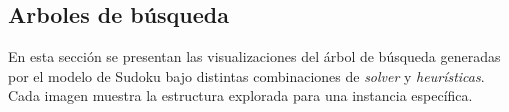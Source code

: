 
\subsection{Arboles de búsqueda}\label{sec:arboles}
En esta sección se presentan las visualizaciones del árbol de búsqueda generadas por el modelo de Sudoku bajo distintas combinaciones de \emph{solver} y \emph{heurísticas}. Cada imagen muestra la estructura explorada para una instancia específica.


